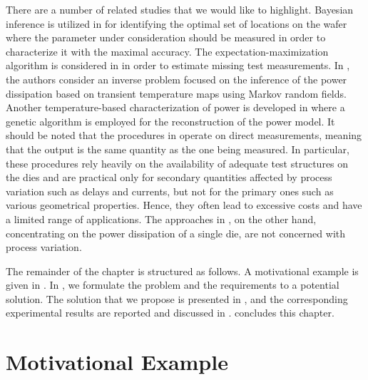 There are a number of related studies that we would like to highlight. Bayesian
inference is utilized in \cite{zhang2010} for identifying the optimal set of
locations on the wafer where the parameter under consideration should be
measured in order to characterize it with the maximal accuracy. The
expectation-maximization algorithm is considered in \cite{reda2009} in order to
estimate missing test measurements. In \cite{paek2012}, the authors consider an
inverse problem focused on the inference of the power dissipation based on
transient temperature maps using Markov random fields. Another temperature-based
characterization of power is developed in \cite{mesa-martinez2007} where a
genetic algorithm is employed for the reconstruction of the power model. It
should be noted that the procedures in \cite{zhang2010, reda2009} operate on
direct measurements, meaning that the output is the same quantity as the one
being measured. In particular, these procedures rely heavily on the availability
of adequate test structures on the dies and are practical only for secondary
quantities affected by process variation such as delays and currents, but not
for the primary ones such as various geometrical properties. Hence, they often
lead to excessive costs and have a limited range of applications. The approaches
in \cite{paek2012, mesa-martinez2007}, on the other hand, concentrating on the
power dissipation of a single die, are not concerned with process variation.

The remainder of the chapter is structured as follows. A motivational example is
given in . In , we formulate the
problem and the requirements to a potential solution. The solution that we
propose is presented in , and the corresponding
experimental results are reported and discussed in .
 concludes this chapter.

\section{Motivational Example}

